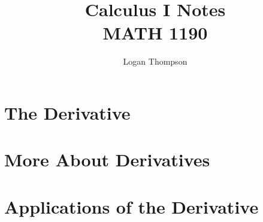 

\title{
    Calculus I Notes\\
    \large MATH 1190}
\author{Logan Thompson}
\date{}


\hypersetup{pageanchor=false}
\maketitle
\hypersetup{pageanchor=true}
\tableofcontents
\newpage
{}
\chapter{The Derivative}





\chapter{More About Derivatives}



\chapter{Applications of the Derivative}

\appendix



